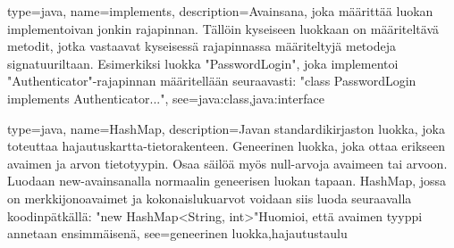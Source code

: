 {
	type=java,
	name=implements,
	description={Avainsana, joka määrittää luokan implementoivan jonkin rajapinnan. Tällöin
kyseiseen luokkaan on määriteltävä metodit, jotka vastaavat kyseisessä rajapinnassa määriteltyjä
metodeja signatuuriltaan. Esimerkiksi luokka "PasswordLogin", joka implementoi
"Authenticator"-rajapinnan määritellään seuraavasti:\newline{}
"class PasswordLogin implements Authenticator..."},
	see={java:class,java:interface}
}

{
	type=java,
	name=HashMap,
	description={Javan standardikirjaston luokka, joka toteuttaa hajautuskartta-tietorakenteen.
Geneerinen luokka, joka ottaa erikseen avaimen ja arvon tietotyypin. Osaa säilöä myös null-arvoja
avaimeen tai arvoon. Luodaan new-avainsanalla normaalin geneerisen luokan tapaan. HashMap, jossa
on merkkijonoavaimet ja kokonaislukuarvot voidaan siis luoda seuraavalla koodinpätkällä:
\newline{}"new HashMap<String, int>"\newline{}Huomioi, että avaimen tyyppi annetaan ensimmäisenä},
	see={geneerinen luokka,hajautustaulu}
}